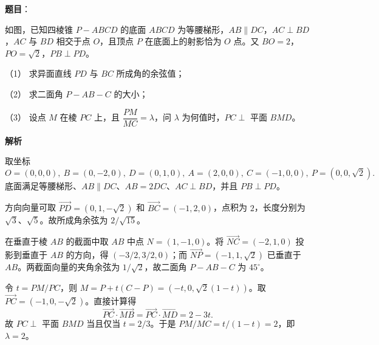 \begin{answer}

\textbf{题目}：

如图，已知四棱锥 $P-ABCD$ 的底面 $ABCD$ 为等腰梯形，$AB\parallel DC$，$AC\perp BD$，$AC$ 与 $BD$ 相交于点 $O$，且顶点 $P$ 在底面上的射影恰为 $O$ 点。又 $BO=2$，$PO=\sqrt2$，$PB\perp PD$。

（1） 求异面直线 $PD$ 与 $BC$ 所成角的余弦值；

（2） 求二面角 $P-AB-C$ 的大小；

（3） 设点 $M$ 在棱 $PC$ 上，且 $\dfrac{PM}{MC}=\lambda$，问 $\lambda$ 为何值时，$PC\perp$ 平面 $BMD$。
\nopagebreak[4]
\begin{center}\end{center}
\nopagebreak[4]
\textbf{解析}

取坐标
\nopagebreak[4]
\[
O=(0,0,0),\ B=(0,-2,0),\ D=(0,1,0),\ A=(2,0,0),\ C=(-1,0,0),\ P=(0,0,\sqrt2).
\]
底面满足等腰梯形、$AB\parallel DC$、$AB=2DC$、$AC\perp BD$，并且 $PB\perp PD$。


方向向量可取 $\overrightarrow{PD}=(0,1,-\sqrt2)$ 和 $\overrightarrow{BC}=(-1,2,0)$，点积为 $2$，长度分别为 $\sqrt3$、$\sqrt5$。故所成角余弦为 $2/\sqrt{15}$。


在垂直于棱 $AB$ 的截面中取 $AB$ 中点 $N=(1,-1,0)$。将 $\overrightarrow{NC}=(-2,1,0)$ 投影到垂直于 $AB$ 的方向，得 $(-3/2,3/2,0)$；而 $\overrightarrow{NP}=(-1,1,\sqrt2)$ 已垂直于 $AB$。两截面向量的夹角余弦为 $1/\sqrt2$，故二面角 $P-AB-C$ 为 $45^\circ$。


令 $t=PM/PC$，则 $M=P+t(C-P)=(-t,0,\sqrt2(1-t))$。取 $\overrightarrow{PC}=(-1,0,-\sqrt2)$。直接计算得
\nopagebreak[4]
\[
\overrightarrow{PC}\cdot\overrightarrow{MB}
=\overrightarrow{PC}\cdot\overrightarrow{MD}=2-3t.
\]
故 $PC\perp$ 平面 $BMD$ 当且仅当 $t=2/3$。于是 $PM/MC=t/(1-t)=2$，即 $\lambda=2$。




\end{answer}
